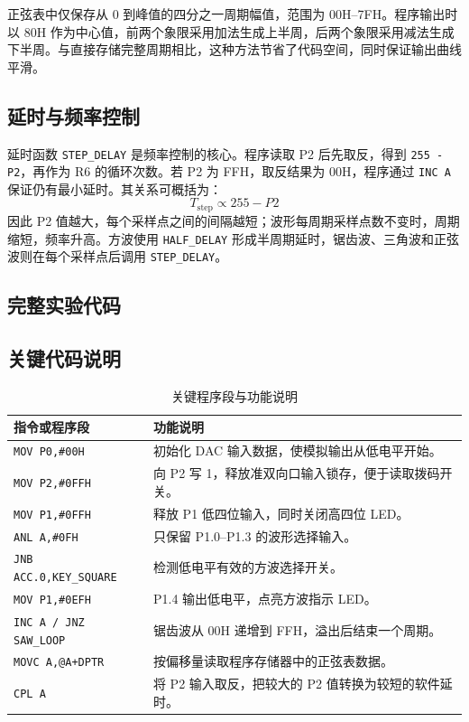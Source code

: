 正弦表中仅保存从 0 到峰值的四分之一周期幅值，范围为 00H--7FH。程序输出时以 80H 作为中心值，前两个象限采用加法生成上半周，后两个象限采用减法生成下半周。与直接存储完整周期相比，这种方法节省了代码空间，同时保证输出曲线平滑。

\subsection{延时与频率控制}
延时函数 \texttt{STEP\_DELAY} 是频率控制的核心。程序读取 P2 后先取反，得到 \texttt{255 - P2}，再作为 R6 的循环次数。若 P2 为 FFH，取反结果为 00H，程序通过 \texttt{INC A} 保证仍有最小延时。其关系可概括为：
\[
  T_{\text{step}} \propto 255 - P2
\]
因此 P2 值越大，每个采样点之间的间隔越短；波形每周期采样点数不变时，周期缩短，频率升高。方波使用 \texttt{HALF\_DELAY} 形成半周期延时，锯齿波、三角波和正弦波则在每个采样点后调用 \texttt{STEP\_DELAY}。

\subsection{完整实验代码}
\lstset{style=a51style}


\subsection{关键代码说明}
\begin{table}[H]
  \centering
  \caption{关键程序段与功能说明}
  \renewcommand{\arraystretch}{1.35}
  \begin{tabular}{p{}p{}}
    \toprule
    指令或程序段 & 功能说明 \\
    \midrule
    \texttt{MOV P0,\#00H} & 初始化 DAC 输入数据，使模拟输出从低电平开始。 \\
    \texttt{MOV P2,\#0FFH} & 向 P2 写 1，释放准双向口输入锁存，便于读取拨码开关。 \\
    \texttt{MOV P1,\#0FFH} & 释放 P1 低四位输入，同时关闭高四位 LED。 \\
    \texttt{ANL A,\#0FH} & 只保留 P1.0--P1.3 的波形选择输入。 \\
    \texttt{JNB ACC.0,KEY\_SQUARE} & 检测低电平有效的方波选择开关。 \\
    \texttt{MOV P1,\#0EFH} & P1.4 输出低电平，点亮方波指示 LED。 \\
    \texttt{INC A / JNZ SAW\_LOOP} & 锯齿波从 00H 递增到 FFH，溢出后结束一个周期。 \\
    \texttt{MOVC A,@A+DPTR} & 按偏移量读取程序存储器中的正弦表数据。 \\
    \texttt{CPL A} & 将 P2 输入取反，把较大的 P2 值转换为较短的软件延时。 \\
    \bottomrule
  \end{tabular}
\end{table}

